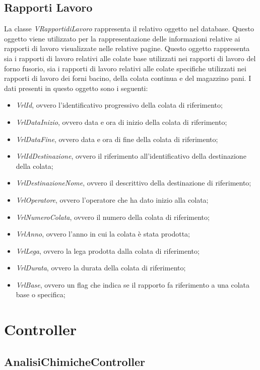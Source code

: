   \subsection{Rapporti Lavoro}
  La classe \textit{VRapportidiLavoro} rappresenta il relativo oggetto nel database. Questo oggetto viene utilizzato per la
  rappresentazione delle informazioni relative ai rapporti di lavoro visualizzate nelle relative pagine.
  Questo oggetto rappresenta sia i rapporti di lavoro relativi alle colate base utilizzati nei rapporti di lavoro del forno
  fusorio, sia i rapporti di lavoro relativi alle colate specifiche utilizzati nei rapporti di lavoro dei forni bacino, della
  colata continua e del magazzino pani. I dati presenti in questo oggetto sono i seguenti:
  \begin{itemize}
    \item \textit{VrlId}, ovvero l'identificativo progressivo della colata di riferimento;
    \item \textit{VrlDataInizio}, ovvero data e ora di inizio della colata di riferimento;
    \item \textit{VrlDataFine}, ovvero data e ora di fine della colata di riferimento;
    \item \textit{VrlIdDestinazione}, ovvero il riferimento all'identificativo della destinazione della colata;
    \item \textit{VrlDestinazioneNome}, ovvero il descrittivo della destinazione di riferimento;
    \item \textit{VrlOperatore}, ovvero l'operatore che ha dato inizio alla colata;
    \item \textit{VrlNumeroColata}, ovvero il numero della colata di riferimento;
    \item \textit{VrlAnno}, ovvero l'anno in cui la colata è stata prodotta;
    \item \textit{VrlLega}, ovvero la lega prodotta dalla colata di riferimento;
    \item \textit{VrlDurata}, ovvero la durata della colata di riferimento;
    \item \textit{VrlBase}, ovvero un flag che indica se il rapporto fa riferimento a una colata base o specifica;
  \end{itemize}
  
  
  \section{Controller}
  \subsection{AnalisiChimicheController}

